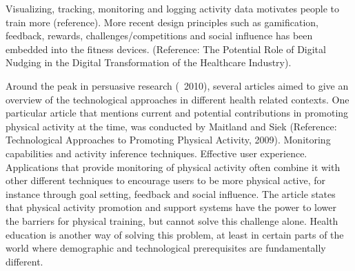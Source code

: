 Visualizing, tracking, monitoring and logging activity data motivates people to train more (reference). More recent design principles such as gamification, feedback, rewards, challenges/competitions and social influence has been embedded into the fitness devices. (Reference: The Potential Role of Digital Nudging in the Digital Transformation of the Healthcare Industry).
 
Around the peak in persuasive research (~2010), several articles aimed to give an overview of the technological approaches in different health related contexts. One particular article that mentions current and potential contributions in promoting physical activity at the time, was conducted by Maitland and Siek (Reference: Technological Approaches to Promoting Physical Activity, 2009). Monitoring capabilities and activity inference techniques. Effective user experience. Applications that provide monitoring of physical activity often combine it with other different techniques to encourage users to be more physical active, for instance through goal setting, feedback and social influence. The article states that physical activity promotion and support systems have the power to lower the barriers for physical training, but cannot solve this challenge alone. Health education is another way of solving this problem, at least in certain parts of the world where demographic and technological prerequisites are fundamentally different.

